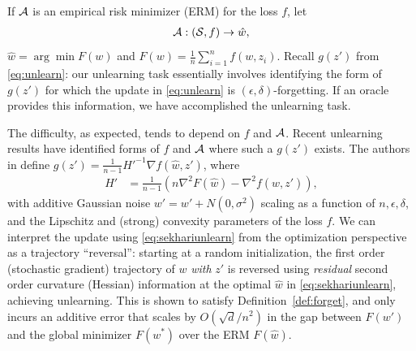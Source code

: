 If $\mathcal{A}$ is an empirical risk minimizer (ERM) for the loss $f$, let
\begin{align}
    \cA : (\cS, f) \rightarrow \hat{w},%
\end{align}
$\hat{w} = \arg\min F(w)$ and $F(w) = \frac{1}{n}\sum_{i=1}^n f(w, z_i).$ 
Recall $g(z')$ from \eqref{eq:unlearn}:  
our unlearning task 
essentially involves 
identifying 
the form of $g(z')$ for which the update in \eqref{eq:unlearn} is $(\epsilon,\delta)$-forgetting. If an oracle provides this information, we have 
accomplished the unlearning task.

The difficulty, 
as expected, tends to 
depend on $f$ and $\mathcal{A}$. 
Recent unlearning results have identified forms of $f$ and $\mathcal{A}$ where such a $g(z')$ exists. The authors in \cite{sekhari2021remember} define $g(z') = \frac{1}{n-1}H'^{-1}\nabla f(\hat{w},z')$, where
\begin{align}\label{eq:sekhariunlearn}
    H' &= \frac{1}{n-1} \left(n\nabla^2 F(\hat{w}) - \nabla^2 f(\hat{w},z')\right),
\end{align}
with additive Gaussian noise $w' = w' + N(0,\sigma^2)$ scaling as a function of $n, \epsilon, \delta$, and the Lipschitz and (strong) convexity parameters of the loss $f$. We can interpret the update using \eqref{eq:sekhariunlearn} from the optimization perspective as a trajectory ``reversal'': starting at a random initialization, the first order (stochastic gradient) trajectory of  ${w}$ {\em with}  $z'$ is reversed using {\em residual} second order curvature (Hessian) information at the optimal $\hat{w}$ in \eqref{eq:sekhariunlearn}, achieving unlearning. This is shown to satisfy Definition~\ref{def:forget}, and only incurs an additive error that scales by $O(\sqrt{d}/n^2)$ in the gap between $F(w')$ and the global minimizer $F(w^*)$ over the ERM $F(\hat{w})$. 

